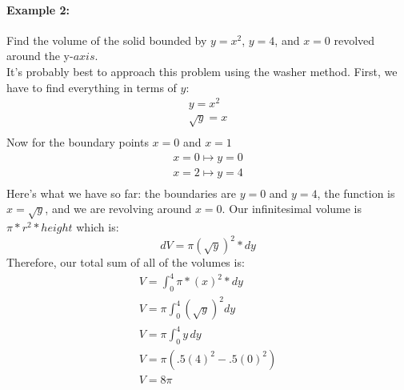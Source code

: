 \documentclass[../revisedmain.tex]{subfiles}
\begin{document}
\paragraph{Example 2:}Find the volume of the solid bounded by $y=x^2$, $y=4$, and $x=0$ revolved around the y-$axis$.\\It's probably best to approach this problem using the washer method. First, we have to find everything in terms of $y$:
\begin{gather*}
	y=x^2\\
	\sqrt{y}=x\\
\end{gather*}
Now for the boundary points $x=0$ and $x=1$
\begin{gather*}
	x=0\mapsto y=0\\
	x=2\mapsto y=4\\
\end{gather*}
Here's what we have so far: the boundaries are $y=0$ and $y=4$, the function is $x=\sqrt{y}$, and we are revolving around $x=0$. Our infinitesimal volume is $\pi*r^2*height$ which is:
\[dV=\pi\left(\sqrt{y}\right)^2*dy\]
Therefore, our total sum of all of the volumes is:
\begin{gather*}
V=\int_{0}^{4}\pi*(x)^2*dy\\
V=\pi\int_{0}^{4}(\sqrt{y})^2dy\\
V=\pi\int_{0}^{4}y\, dy\\
V=\pi\left(.5(4)^2-.5(0)^2\right)\\
V=8\pi\\
\end{gather*}
\end{document}

